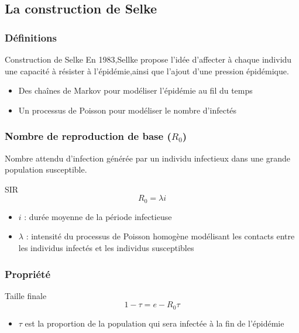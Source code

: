 \subsection{La construction de Selke}

\begin{frame}
    \frametitle{Définitions}
    \begin{block}{Construction de Selke}
        En 1983,Sellke propose l'idée d'affecter à chaque individu une capacité à résister à l'épidémie,ainsi que l'ajout d'une pression épidémique.
    \end{block}

    \begin{itemize}
        \item Des chaînes de Markov pour modéliser l'épidémie au fil du temps
        \item Un processus de Poisson pour modéliser le nombre d'infectés
    \end{itemize}
\end{frame}


\begin{frame}
        \frametitle{Nombre de reproduction de base ($R_0$)}

        Nombre attendu d’infection générée par un individu infectieux dans une grande population susceptible.

        \begin{alertblock}{SIR}
                $$ R_0 =  \lambda i $$
        \end{alertblock}

        \begin{itemize}
                \item $i$ : durée moyenne de la période infectieuse
                \item $\lambda$ : intensité du processus de Poisson homogène modélisant les contacts entre les individus infectés et les individus susceptibles
        \end{itemize}
\end{frame}

\begin{frame}
    \frametitle{Propriété}

    \begin{block}{Taille finale}
        $$ 1 - \tau = e - R_0\tau $$
    \end{block}

    \begin{itemize}
        \item $\tau$ est la proportion de la population qui sera infectée à la fin de l’épidémie
    \end{itemize}
\end{frame}


